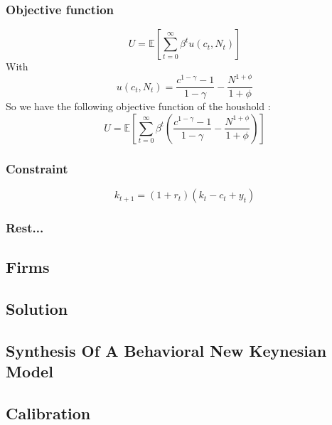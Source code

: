 \documentclass{beamer}
\begin{document}
\subsubsection{Objective function}
\begin{frame}{\subsecname}
    \begin{equation}
        \label{3}
        U = \mathbb{E}\left[\sum_{t=0}^{\infty}\beta^{t}u(c_t,N_t)\right]
    \end{equation}
    With
    \begin{equation*}
    u(c_t,N_t) = \frac{c^{1-\gamma}-1}{1-\gamma}-\frac{N^{1+\phi}}{1+\phi}
    \end{equation*}
    So we have the following objective function of the houshold : 
    \begin{equation*}
        U = \mathbb{E}\left[\sum_{t=0}^{\infty}\beta^{t}\left(\frac{c^{1-\gamma}-1}{1-\gamma}-\frac{N^{1+\phi}}{1+\phi}\right)\right]
    \end{equation*}
\end{frame}

\subsubsection{Constraint}
\begin{frame}{\subsecname}
    \begin{equation}\label{4}
        k_{t+1}=(1+r_t)(k_t-c_t+y_t)
    \end{equation}
\end{frame}

\subsubsection{Rest...}

\subsection{Firms}

\subsection{Solution}

\subsection{Synthesis Of A Behavioral New Keynesian Model}

\subsection{Calibration}
\end{document}
